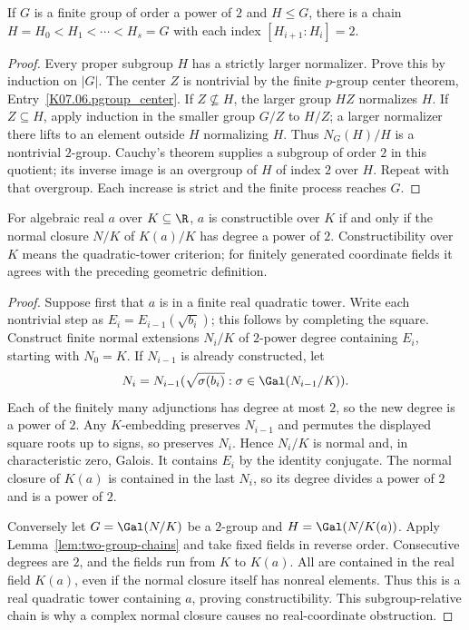 \begin{lemma}\label{lem:two-group-chains}
If $G$ is a finite group of order a power of $2$ and $H\leq G$, there is a chain $H=H_0< H_1<\cdots<H_s=G$ with each index $[H_{i+1}:H_i]=2$.
\end{lemma}
\begin{proof}
Every proper subgroup $H$ has a strictly larger normalizer. Prove this by induction on $|G|$. The center $Z$ is nontrivial by the finite $p$-group center theorem, Entry~\ref{K07.06.pgroup_center}. If $Z\nsubseteq H$, the larger group $HZ$ normalizes $H$. If $Z\subseteq H$, apply induction in the smaller group $G/Z$ to $H/Z$; a larger normalizer there lifts to an element outside $H$ normalizing $H$. Thus $N_G(H)/H$ is a nontrivial $2$-group. Cauchy's theorem supplies a subgroup of order $2$ in this quotient; its inverse image is an overgroup of $H$ of index $2$ over $H$. Repeat with that overgroup. Each increase is strict and the finite process reaches $G$.
\end{proof}

\begin{theorem}
For algebraic real $a$ over $K\subseteq\R$, $a$ is constructible over $K$ if and only if the normal closure $N/K$ of $K(a)/K$ has degree a power of $2$. Constructibility over $K$ means the quadratic-tower criterion; for finitely generated coordinate fields it agrees with the preceding geometric definition.
\end{theorem}
\begin{proof}
Suppose first that $a$ is in a finite real quadratic tower. Write each nontrivial step as $E_i=E_{i-1}(\sqrt{b_i})$; this follows by completing the square. Construct finite normal extensions $N_i/K$ of $2$-power degree containing $E_i$, starting with $N_0=K$. If $N_{i-1}$ is already constructed, let
\[N_i=N_{i-1}(\sqrt{\sigma(b_i)}:\sigma\in\Gal(N_{i-1}/K)).\]
Each of the finitely many adjunctions has degree at most $2$, so the new degree is a power of $2$. Any $K$-embedding preserves $N_{i-1}$ and permutes the displayed square roots up to signs, so preserves $N_i$. Hence $N_i/K$ is normal and, in characteristic zero, Galois. It contains $E_i$ by the identity conjugate. The normal closure of $K(a)$ is contained in the last $N_i$, so its degree divides a power of $2$ and is a power of $2$.

Conversely let $G=\Gal(N/K)$ be a $2$-group and $H=\Gal(N/K(a))$. Apply Lemma~\ref{lem:two-group-chains} and take fixed fields in reverse order. Consecutive degrees are $2$, and the fields run from $K$ to $K(a)$. All are contained in the real field $K(a)$, even if the normal closure itself has nonreal elements. Thus this is a real quadratic tower containing $a$, proving constructibility. This subgroup-relative chain is why a complex normal closure causes no real-coordinate obstruction.
\end{proof}

